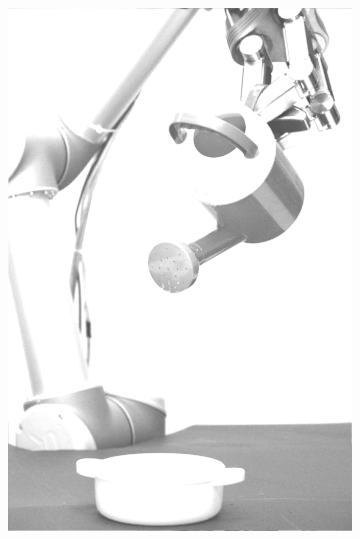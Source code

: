 \begin{figure}[H]
\begin{subfigure}[b]{0.1\textwidth}
        \includegraphics[width=\textwidth]{img3/test/contrast_5_1_5_final_img3.png}
    \end{subfigure}
        \begin{subfigure}[b]{0.1\textwidth}

\end{subfigure}
\end{figure}
